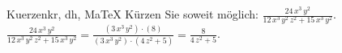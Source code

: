 \begin{MAufgabe}{Kuerzen}{kr, dh, MaTeX}
K\"urzen Sie soweit m\"oglich: $\frac{24\, x^3\, y^2}{12\, x^3\, y^2\, z^2 + 15\, x^3\, y^2}$.\\ 
\ifLsg\MLoesung
\quad $\frac{24\, x^3\, y^2}{12\, x^3\, y^2\, z^2 + 15\, x^3\, y^2}=\frac{(3\, x^3\, y^2)\cdot(8)}{(3\, x^3\, y^2)\cdot(4\, z^2 + 5)}=\frac{8}{4\, z^2 + 5}$.\else\relax\fi
 \end{MAufgabe}